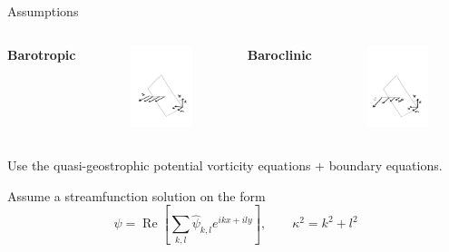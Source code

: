 \documentclass{beamer}
\begin{document}
\begin{frame}{Assumptions}
\begin{columns}
\textbf{Barotropic}
\begin{figure}
    \includegraphics[trim=1cm 0 0 7cm,clip,angle=-90,origin=c,width=0.6\linewidth]
    {figures/barotropic_parameterss.pdf}
\end{figure}
\textbf{Baroclinic}
\begin{figure}
    \includegraphics[trim=1cm 0 0 7cm,clip,angle=-90,origin=c,width=0.6\linewidth]{figures/baroclinic_parameterss.pdf}
\end{figure}

\end{columns}
Use the quasi-geostrophic potential vorticity equations + boundary equations.

Assume a streamfunction solution on the form
\begin{equation*}
    \psi = \operatorname{Re}\left[\sum_{k,l} \hat{\psi}_{k,l}e^{ikx+ily}\right], \qquad \kappa^2 = k^2+l^2 
\end{equation*}

\end{frame}
\end{document}
